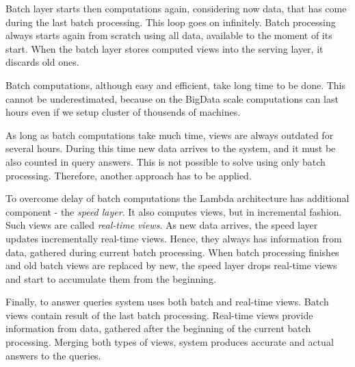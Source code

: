 Batch layer starts then computations again, considering now data, that has come during the last batch processing.
This loop goes on infinitely.
Batch processing always starts again from scratch using all data, available to the moment of its start.
When the batch layer stores computed views into the serving layer, it discards old ones.

Batch computations, although easy and efficient, take long time to be done.
This cannot be underestimated, because on the BigData scale computations can last hours even if we setup cluster of thousends of machines.

As long as batch computations take much time, views are always outdated for several hours.
During this time new data arrives to the system, and it must be also counted in query answers.
This is not possible to solve using only batch processing.
Therefore, another approach has to be applied.

To overcome delay of batch computations the Lambda architecture has additional component - the \textit{speed layer}.
It also computes views, but in incremental fashion.
Such views are called \textit{real-time views}.
As new data arrives, the speed layer updates incrementally real-time views.
Hence, they always has information from data, gathered during current batch processing.
When batch processing finishes and old batch views are replaced by new, the speed layer drops real-time views and start to accumulate them from the beginning.

Finally, to answer queries system uses both batch and real-time views.
Batch views contain result of the last batch processing.
Real-time views provide information from data, gathered after the beginning of the current batch processing.
Merging both types of views, system produces accurate and actual answers to the queries.